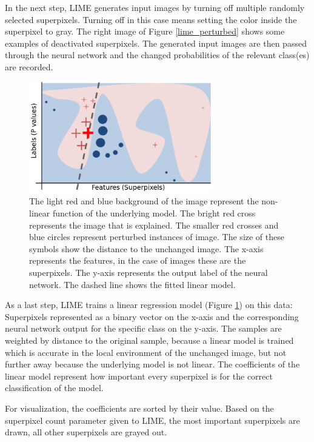 In the next step, LIME generates input images by turning off multiple randomly selected superpixels. Turning off in this case means setting the color inside the superpixel to gray. The right image of Figure \ref{lime_perturbed} shows some examples of deactivated superpixels. The generated input images are then passed through the neural network and the changed probabilities of the relevant class(es) are recorded.

\begin{figure}[H]
\centering
\includegraphics[width=8cm]{chapters/02_methods/images/lime2.png}
\caption{
The light red and blue background of the image represent the non-linear function of the underlying model.
The bright red cross represents the image that is explained. The smaller red crosses and blue circles represent
perturbed instances of image. The size of these symbols show the distance to the unchanged image. The x-axis represents the features, in the case of images these are the superpixels. The y-axis represents the output label of the neural network. The dashed line shows the fitted linear model.}
\label{lime_linear_regression}
\end{figure}

As a last step, LIME trains a linear regression model (Figure \ref{lime_linear_regression}) on this data: Superpixels represented as a binary vector on the x-axis and the corresponding neural network output for the specific class on the y-axis. The samples are weighted by distance to the original sample, because a linear model is trained which is accurate in the local environment of the unchanged image, but not further away because the underlying model is not linear. The coefficients of the linear model represent how important every superpixel is for the correct classification of the model.

For visualization, the coefficients are sorted by their value. Based on the superpixel count parameter given to LIME, the most important superpixels are drawn, all other superpixels are grayed out. 


